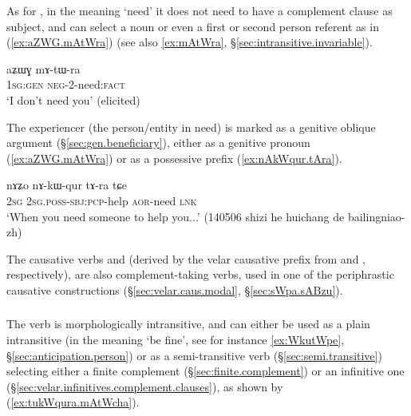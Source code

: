 As for , in the meaning `need' it does not need to have a complement clause as subject, and can select a noun or even a first or second person referent as in (\ref{ex:aZWG.mAtWra}) (see also \ref{ex:mAtWra}, §\ref{sec:intransitive.invariable}).  

\begin{exe} 
\ex \label{ex:aZWG.mAtWra}
\gll  aʑɯɣ mɤ-tɯ-ra \\
 \textsc{1sg}:\textsc{gen} \textsc{neg}-2-need:\textsc{fact} \\
 \glt `I don't need you' (elicited)
\end{exe} 

The experiencer (the person/entity in need) is marked as a genitive oblique argument (§\ref{sec:gen.beneficiary}), either as a genitive pronoun (\ref{ex:aZWG.mAtWra}) or as a possessive prefix (\ref{ex:nAkWqur.tAra}).
 
\begin{exe} 
\ex \label{ex:nAkWqur.tAra}
\gll nɤʑo nɤ-kɯ-qur tɤ-ra tɕe \\
\textsc{2sg} \textsc{2sg}.\textsc{poss}-\textsc{sbj}:\textsc{pcp}-help \textsc{aor}-need \textsc{lnk} \\
\glt `When you need someone to help you...' (140506 shizi he huichang de bailingniao-zh)
\end{exe}  


The causative verbs  and   (derived by the velar causative prefix from  and , respectively), are also com\-ple\-ment-taking verbs, used in one of the periphrastic causative constructions (§\ref{sec:velar.caus.modal}, §\ref{sec:sWpa.sABzu}).

 \subsubsection{} \label{sec:cha.verb}
 
The verb  is morphologically intransitive, and can either be used as a plain intransitive (in the meaning `be fine', see for instance \ref{ex:WkutWpe}, §\ref{sec:anticipation.person}) or as a semi-transitive verb (§\ref{sec:semi.transitive}) selecting either a finite complement (§\ref{sec:finite.complement}) or an infinitive one (§\ref{sec:velar.infinitives.complement.clauses}), as shown by (\ref{ex:tukWqura.mAtWcha}).

